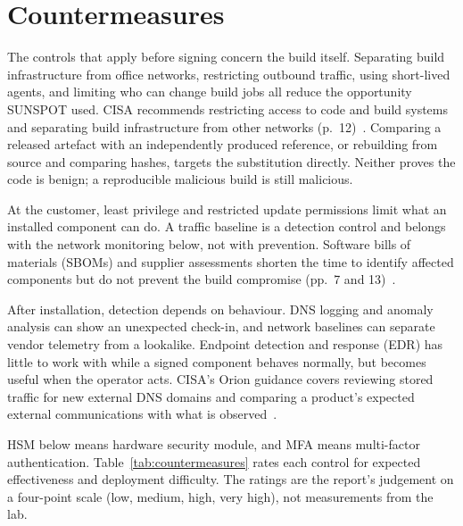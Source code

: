 \section{Countermeasures}
\label{sec:countermeasures}

The controls that apply before signing concern the build itself. Separating build infrastructure from office networks, restricting outbound traffic, using short-lived agents, and limiting who can change build jobs all reduce the opportunity SUNSPOT used. CISA recommends restricting access to code and build systems and separating build infrastructure from other networks (p.~12)~\cite{cisa-supply-chain}. Comparing a released artefact with an independently produced reference, or rebuilding from source and comparing hashes, targets the substitution directly. Neither proves the code is benign; a reproducible malicious build is still malicious.

At the customer, least privilege and restricted update permissions limit what an installed component can do. A traffic baseline is a detection control and belongs with the network monitoring below, not with prevention. Software bills of materials (SBOMs) and supplier assessments shorten the time to identify affected components but do not prevent the build compromise (pp.~7 and 13)~\cite{cisa-supply-chain}.

After installation, detection depends on behaviour. DNS logging and anomaly analysis can show an unexpected check-in, and network baselines can separate vendor telemetry from a lookalike. Endpoint detection and response (EDR) has little to work with while a signed component behaves normally, but becomes useful when the operator acts. CISA's Orion guidance covers reviewing stored traffic for new external DNS domains and comparing a product's expected external communications with what is observed~\cite{cisa-aa20-352a,cisa-supply-chain}.

HSM below means hardware security module, and MFA means multi-factor authentication. Table~\ref{tab:countermeasures} rates each control for expected effectiveness and deployment difficulty. The ratings are the report's judgement on a four-point scale (low, medium, high, very high), not measurements from the lab.

